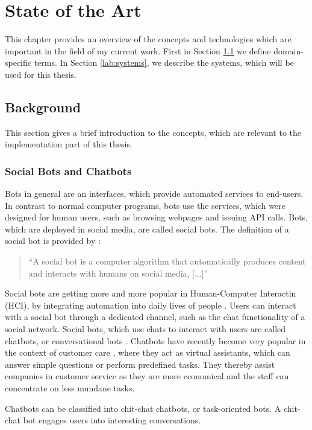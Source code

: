 \chapter{State of the Art}
This chapter provides an overview of the concepts and technologies which are important in the field of my current work. First in Section \ref{lab:background} we define domain-specific terms. In Section \ref{lab:systems}, we describe the systems, which will be used for this thesis.

\section{Background} \label{lab:background}

This section gives a brief introduction to the concepts, which are relevant to the implementation part of this thesis.

\subsection{Social Bots and Chatbots}
Bots in general are an interfaces, which provide automated services to end-users.
In contrast to normal computer programs, bots use the services, which were designed for human users, such as browsing webpages and issuing API calls.
Bots, which are deployed in social media, are called social bots.
The definition of a social bot is provided by \cite{FVD*16b}:
\begin{quote}
	``A social bot is a computer algorithm that automatically produces content and interacts with humans on social media, [...]''
\end{quote}

Social bots are getting more and more popular in Human-Computer Interactin (HCI), by integrating automation into daily lives of people \cite{BFPN17}. Users can interact with a social bot through a dedicated channel, such as the chat functionality of a social network.
Social bots, which use chats to interact with users are called chatbots, or conversational bots \cite{WWX*16}.
Chatbots have recently become very popular in the context of customer care \cite{CHW*17,FVD*16b}, where they act as virtual assistants, which can answer simple questions \cite{CaWh14} or perform predefined tasks.
They thereby assist companies in customer service as they are more economical and the staff can concentrate on less mundane tasks.

Chatbots can be classified into chit-chat chatbots, or task-oriented bots.
A chit-chat bot engages users into interesting conversations.

